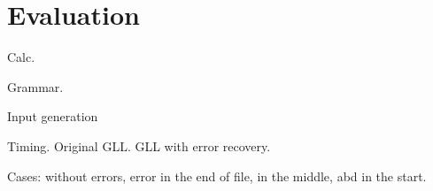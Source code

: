 \section{Evaluation}
\label{sec:evaluation}

Calc. 

Grammar.

Input generation

Timing. Original GLL. GLL with error recovery. 


Cases: without errors, error in the end of file, in the middle, abd in the start.
